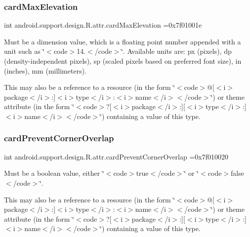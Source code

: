 \subsubsection{\texorpdfstring{card\+Max\+Elevation}{cardMaxElevation}}
{\footnotesize\ttfamily int android.\+support.\+design.\+R.\+attr.\+card\+Max\+Elevation =0x7f01001e\hspace{0.3cm}{\ttfamily [static]}}

Must be a dimension value, which is a floating point number appended with a unit such as \char`\"{}$<$code$>$14.\+5sp$<$/code$>$\char`\"{}. Available units are\+: px (pixels), dp (density-\/independent pixels), sp (scaled pixels based on preferred font size), in (inches), mm (millimeters). 

This may also be a reference to a resource (in the form \char`\"{}$<$code$>$@\mbox{[}$<$i$>$package$<$/i$>$\+:\mbox{]}$<$i$>$type$<$/i$>$\+:$<$i$>$name$<$/i$>$$<$/code$>$\char`\"{}) or theme attribute (in the form \char`\"{}$<$code$>$?\mbox{[}$<$i$>$package$<$/i$>$\+:\mbox{]}\mbox{[}$<$i$>$type$<$/i$>$\+:\mbox{]}$<$i$>$name$<$/i$>$$<$/code$>$\char`\"{}) containing a value of this type. \mbox{\label{classandroid_1_1support_1_1design_1_1R_1_1attr_a550a939ee685a91fd5d5842fefc73113}} 
\subsubsection{\texorpdfstring{card\+Prevent\+Corner\+Overlap}{cardPreventCornerOverlap}}
{\footnotesize\ttfamily int android.\+support.\+design.\+R.\+attr.\+card\+Prevent\+Corner\+Overlap =0x7f010020\hspace{0.3cm}{\ttfamily [static]}}

Must be a boolean value, either \char`\"{}$<$code$>$true$<$/code$>$\char`\"{} or \char`\"{}$<$code$>$false$<$/code$>$\char`\"{}. 

This may also be a reference to a resource (in the form \char`\"{}$<$code$>$@\mbox{[}$<$i$>$package$<$/i$>$\+:\mbox{]}$<$i$>$type$<$/i$>$\+:$<$i$>$name$<$/i$>$$<$/code$>$\char`\"{}) or theme attribute (in the form \char`\"{}$<$code$>$?\mbox{[}$<$i$>$package$<$/i$>$\+:\mbox{]}\mbox{[}$<$i$>$type$<$/i$>$\+:\mbox{]}$<$i$>$name$<$/i$>$$<$/code$>$\char`\"{}) containing a value of this type. \mbox{\label{classandroid_1_1support_1_1design_1_1R_1_1attr_a183c5ee389982503b56ef6304d75d768}} 
